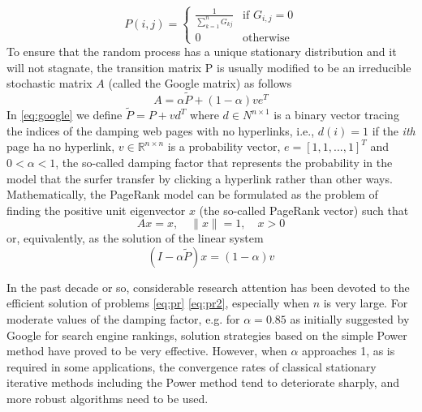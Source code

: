 \documentclass[12pt]{article}
\newcommand{\R}{\mathbb{R}}
\begin{document}
\begin{equation}\label{eq:transition}
    P(i,j) =
    \begin{cases}
        \displaystyle \frac{1}{\sum_{k=1}^n G_{kj}} & \text{if } G_{i,j} = 0 \\
        0 & \text{otherwise}
    \end{cases}
\end{equation}
To ensure that the random process has a unique stationary distribution and it will not stagnate, the transition matrix P is usually modified to be an irreducible stochastic matrix $A$ (called the Google matrix) as follows
\begin{equation}\label{eq:google}
    A = \alpha \tilde P + (1 - \alpha)v e^T
\end{equation}
In \ref{eq:google} we define $\tilde P = P + vd^T$ where $d \in N^{n \times 1}$ is a binary vector tracing the indices of the damping web pages with no hyperlinks, i.e., $d(i) = 1$ if the \emph{ith} page ha no hyperlink, $v \in \R^{n \times n}$ is a probability vector, $e = [1, 1, ... ,1]^T$ and $0<\alpha<1$, the so-called damping factor that represents the probability in the model that the surfer transfer by clicking a hyperlink rather than other ways. Mathematically, the PageRank model can be formulated as the problem of finding the positive unit eigenvector $x$ (the so-called PageRank vector) such that
\begin{equation}\label{eq:pr}
    Ax = x, \quad \lVert x \rVert = 1, \quad x > 0
\end{equation}
or, equivalently, as the solution of the linear system
\begin{equation}\label{eq:pr2}
    (I - \alpha \tilde P)x = (1 - \alpha)v
\end{equation}

\noindent In the past decade or so, considerable research attention has been devoted to the efficient solution of problems \ref{eq:pr} \ref{eq:pr2}, especially when $n$ is very large. For moderate values of the damping factor, e.g. for $\alpha = 0.85$ as initially suggested by Google for search engine rankings, solution strategies based on the simple Power method have proved to be very effective. However, when $\alpha$ approaches 1, as is required in some applications, the convergence rates of classical stationary iterative methods including the Power method tend to deteriorate sharply, and more robust algorithms need to be used. \vspace*{0.4cm}
\end{document}

